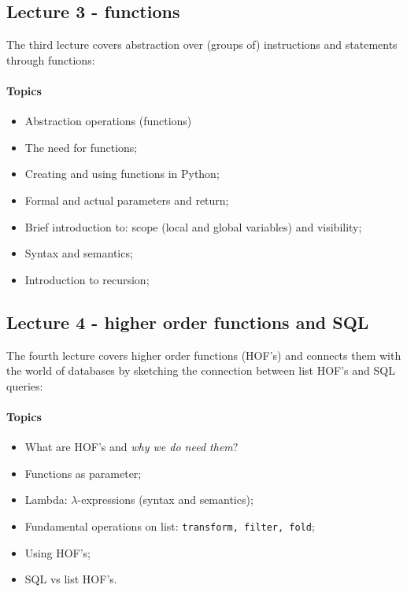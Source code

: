 			\subsection{Lecture 3 - functions}
				The third lecture covers abstraction over (groups of) instructions and statements through functions:

				\paragraph*{Topics}
					\begin{itemize}
						\item Abstraction operations (functions)
						\item The need for functions;
						\item Creating and using functions in Python;
						\item Formal and actual parameters and return;
						\item Brief introduction to: scope (local and global variables) and visibility;
						\item Syntax and semantics;
						\item Introduction to recursion;
					\end{itemize}

			\subsection{Lecture 4 - higher order functions and SQL}
				The fourth lecture covers higher order functions (HOF's) and connects them with the world of databases by sketching the connection between list HOF's and SQL queries:

				\paragraph*{Topics}
					\begin{itemize}
						\item What are HOF's and \textit{why we do need them}?
						\item Functions as parameter;
						\item Lambda: $\lambda$-expressions (syntax and semantics);
						\item Fundamental operations on list: \texttt{transform, filter, fold};
						\item Using HOF's;
						\item SQL vs list HOF's.
					\end{itemize}

